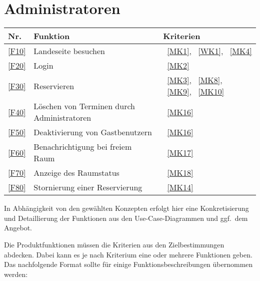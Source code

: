 \section{Administratoren}\label{sec:adminfunktionen}

\begin{table}[htbp]
    \centering
    \begin{tabularx}{\textwidth}{ l|X|l }
        \textbf{Nr.} & \textbf{Funktion} & \textbf{Kriterien} \\ \hline\hline
        \ref{F10} & Landeseite besuchen &~\ref{MK1}, ~\ref{WK1}, ~\ref{MK4} \\
        \ref{F20} & Login &~\ref{MK2} \\
        \ref{F30} & Reservieren &~\ref{MK3}, ~\ref{MK8}, ~\ref{MK9}, ~\ref{MK10} \\
        \ref{F40} & Löschen von Terminen durch Administratoren &~\ref{MK16} \\
        \ref{F50} & Deaktivierung von Gastbenutzern &~\ref{MK16} \\
        \ref{F60} & Benachrichtigung bei freiem Raum &~\ref{MK17} \\
        \ref{F70} & Anzeige des Raumstatus &~\ref{MK18} \\
        \ref{F80} & Stornierung einer Reservierung &~\ref{MK14} \\
    \end{tabularx}
    \label{tab:adminfunctions}
\end{table}


\iffalse
In Abhängigkeit von den gewählten Konzepten erfolgt hier eine Konkretisierung
und Detaillierung der Funktionen aus den Use-Case-Diagrammen und ggf.\ dem
Angebot.

Die Produktfunktionen müssen die Kriterien aus den Zielbestimmungen abdecken.
Dabei kann es je nach Kriterium eine oder mehrere Funktionen geben.
Das nachfolgende Format sollte für einige Funktionsbeschreibungen übernommen werden:


